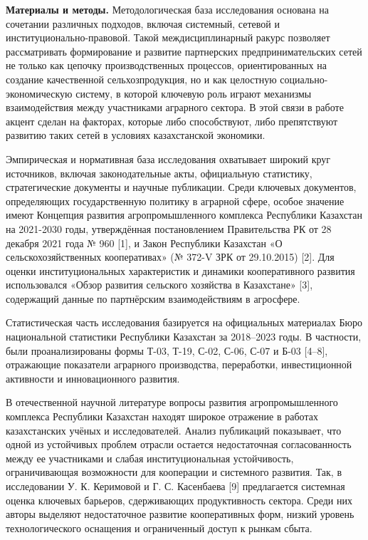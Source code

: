 {\bfseries Материалы и методы.} Методологическая база исследования основана
на сочетании различных подходов, включая системный, сетевой и
институционально-правовой. Такой междисциплинарный ракурс позволяет
рассматривать формирование и развитие партнерских предпринимательских
сетей не только как цепочку производственных процессов, ориентированных
на создание качественной сельхозпродукция, но и как целостную
социально-экономическую систему, в которой ключевую роль играют
механизмы взаимодействия между участниками аграрного сектора. В этой
связи в работе акцент сделан на факторах, которые либо способствуют,
либо препятствуют развитию таких сетей в условиях казахстанской
экономики.

Эмпирическая и нормативная база исследования охватывает широкий круг
источников, включая законодательные акты, официальную статистику,
стратегические документы и научные публикации. Среди ключевых
документов, определяющих государственную политику в аграрной сфере,
особое значение имеют Концепция развития агропромышленного комплекса
Республики Казахстан на 2021-2030 годы, утверждённая постановлением
Правительства РК от 28 декабря 2021 года № 960 {[}1{]}, и Закон
Республики Казахстан «О сельскохозяйственных кооперативах» (№ 372-V ЗРК
от 29.10.2015) {[}2{]}. Для оценки институциональных характеристик и
динамики кооперативного развития использовался «Обзор развития сельского
хозяйства в Казахстане» {[}3{]}, содержащий данные по партнёрским
взаимодействиям в агросфере.

Статистическая часть исследования базируется на официальных материалах
Бюро национальной статистики Республики Казахстан за 2018--2023 годы. В
частности, были проанализированы формы Т-03, Т-19, С-02, С-06, С-07 и
Б-03 {[}4--8{]}, отражающие показатели аграрного производства,
переработки, инвестиционной активности и инновационного развития.

В отечественной научной литературе вопросы развития агропромышленного
комплекса Республики Казахстан находят широкое отражение в работах
казахстанских учёных и исследователей. Анализ публикаций показывает, что
одной из устойчивых проблем отрасли остается недостаточная
согласованность между ее участниками и слабая институциональная
устойчивость, ограничивающая возможности для кооперации и системного
развития. Так, в исследовании У. К. Керимовой и Г. С. Касенбаева {[}9{]}
предлагается системная оценка ключевых барьеров, сдерживающих
продуктивность сектора. Среди них авторы выделяют недостаточное развитие
кооперативных форм, низкий уровень технологического оснащения и
ограниченный доступ к рынкам сбыта.

